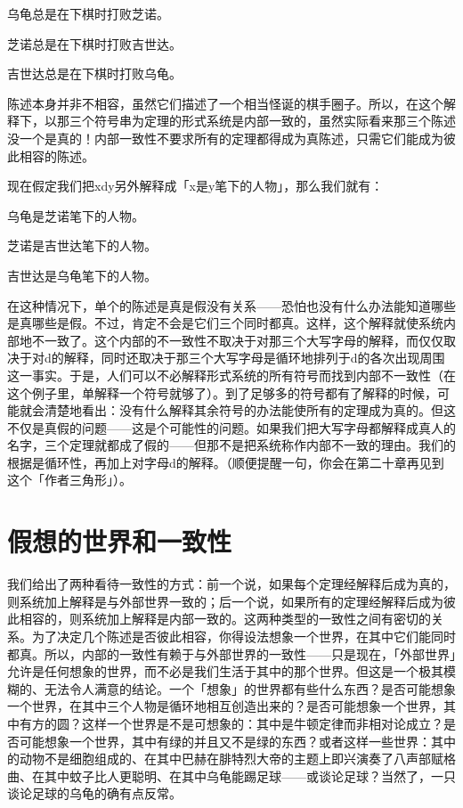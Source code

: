 \documentclass[
  12pt,
  twoside,
  openright,
  oldfontcommands,
]{memoir}
\begin{document}
乌龟总是在下棋时打败芝诺。

芝诺总是在下棋时打败吉世达。

吉世达总是在下棋时打败乌龟。

陈述本身并非不相容，虽然它们描述了一个相当怪诞的棋手圈子。所以，在这个解释下，以那三个符号串为定理的形式系统是内部一致的，虽然实际看来那三个陈述没一个是真的！内部一致性不要求所有的定理都得成为真陈述，只需它们能成为彼此相容的陈述。

现在假定我们把xdy另外解释成「x是y笔下的人物」，那么我们就有：

乌龟是芝诺笔下的人物。

芝诺是吉世达笔下的人物。

吉世达是乌龟笔下的人物。

在这种情况下，单个的陈述是真是假没有关系------恐怕也没有什么办法能知道哪些是真哪些是假。不过，肯定不会是它们三个同时都真。这样，这个解释就使系统内部地不一致了。这个内部的不一致性不取决于对那三个大写字母的解释，而仅仅取决于对d的解释，同时还取决于那三个大写字母是循环地排列于d的各次出现周围这一事实。于是，人们可以不必解释形式系统的所有符号而找到内部不一致性（在这个例子里，单解释一个符号就够了）。到了足够多的符号都有了解释的时候，可能就会清楚地看出：没有什么解释其余符号的办法能使所有的定理成为真的。但这不仅是真假的问题------这是个可能性的问题。如果我们把大写字母都解释成真人的名字，三个定理就都成了假的------但那不是把系统称作内部不一致的理由。我们的根据是循环性，再加上对字母d的解释。（顺便提醒一句，你会在第二十章再见到这个「作者三角形」）。

\section{假想的世界和一致性}

我们给出了两种看待一致性的方式：前一个说，如果每个定理经解释后成为真的，则系统加上解释是与外部世界一致的；后一个说，如果所有的定理经解释后成为彼此相容的，则系统加上解释是内部一致的。这两种类型的一致性之间有密切的关系。为了决定几个陈述是否彼此相容，你得设法想象一个世界，在其中它们能同时都真。所以，内部的一致性有赖于与外部世界的一致性------只是现在，「外部世界」允许是任何想象的世界，而不必是我们生活于其中的那个世界。但这是一个极其模糊的、无法令人满意的结论。一个「想象」的世界都有些什么东西？是否可能想象一个世界，在其中三个人物是循环地相互创造出来的？是否可能想象一个世界，其中有方的圆？这样一个世界是不是可想象的：其中是牛顿定律而非相对论成立？是否可能想象一个世界，其中有绿的并且又不是绿的东西？或者这样一些世界：其中的动物不是细胞组成的、在其中巴赫在腓特烈大帝的主题上即兴演奏了八声部赋格曲、在其中蚊子比人更聪明、在其中乌龟能踢足球------或谈论足球？当然了，一只谈论足球的乌龟的确有点反常。
\end{document}
